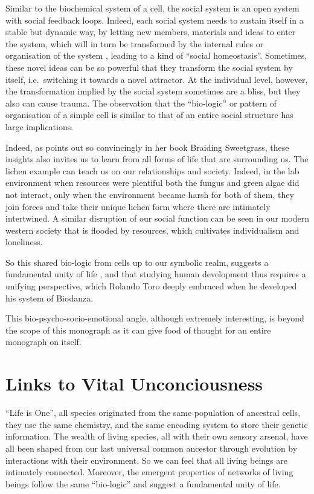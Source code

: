 \documentclass[
  11pt,
]{book}
\begin{document}
Similar to the biochemical system of a cell, the social system is an open system with social feedback loops. Indeed, each social system needs to sustain itself in a stable but dynamic way, by letting new members, materials and ideas to enter the system, which will in turn be transformed by the internal rules or organisation of the system \citep{capraLuisi2014}, leading to a kind of ``social homeostasis''. Sometimes, these novel ideas can be so powerful that they transform the social system by itself, i.e.~switching it towards a novel attractor. At the individual level, however, the transformation implied by the social system sometimes are a bliss, but they also can cause trauma. The observation that the ``bio-logic'' or pattern of organisation of a simple cell is similar to that of an entire social structure has large implications.

Indeed, as \citet{Kimmerer2013} points out so convincingly in her book Braiding Sweetgrass, these insights also invites us to learn from all forms of life that are surrounding us.
The lichen example can teach us on our relationships and society. Indeed, in the lab environment when resources were plentiful both the fungus and green algae did not interact, only when the environment became harsh for both of them, they join forces and take their unique lichen form where there are intimately intertwined. A similar disruption of our social function can be seen in our modern western society that is flooded by resources, which cultivates individualism and loneliness.

So this shared bio-logic from cells up to our symbolic realm, suggests a fundamental unity of life \citep{capraLuisi2014}, and that studying human development thus requires a unifying perspective, which Rolando Toro deeply embraced when he developed his system of Biodanza.

This bio-psycho-socio-emotional angle, although extremely interesting, is beyond the scope of this monograph as it can give food of thought for an entire monograph on itself.

\hypertarget{links-to-vital-unconciousness}{%
\section{Links to Vital Unconciousness}\label{links-to-vital-unconciousness}}

``Life is One'', all species originated from the same population of ancestral cells, they use the same chemistry, and the same encoding system to store their genetic information.
The wealth of living species, all with their own sensory arsenal, have all been shaped from our last universal common ancestor through evolution by interactions with their environment.
So we can feel that all living beings are intimately connected. Moreover, the emergent properties of networks of living beings follow the same ``bio-logic'' and suggest a fundamental unity of life.
\end{document}
